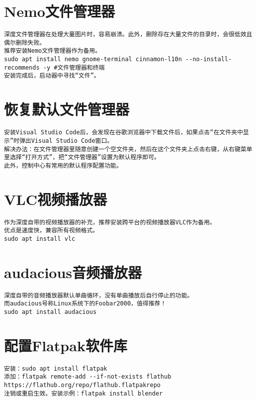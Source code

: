 \documentclass[a4paper,fontset=fandol,zihao=-4,linespread=1.2]{ctexbook}
\begin{document}
\section{Nemo文件管理器}
\begin{lstlisting}
深度文件管理器在处理大量图片时，容易崩溃。此外，删除存在大量文件的目录时，会很低效且偶尔删除失败。
推荐安装Nemo文件管理器作为备用。
sudo apt install nemo gnome-terminal cinnamon-l10n --no-install-recommends -y #文件管理器和终端
安装完成后，启动器中寻找“文件”。
\end{lstlisting}

\section{恢复默认文件管理器}
\begin{lstlisting}
安装Visual Studio Code后，会发现在谷歌浏览器中下载文件后，如果点击“在文件夹中显示”时弹出Visual Studio Code窗口。
解决办法：在文件管理器里随意创建一个空文件夹，然后在这个文件夹上点击右键，从右键菜单里选择“打开方式”，把“文件管理器”设置为默认程序即可。
此外，控制中心有常用的默认程序配置功能。
\end{lstlisting}

\section{VLC视频播放器}
\begin{lstlisting}
作为深度自带的视频播放器的补充，推荐安装跨平台的视频播放器VLC作为备用。
优点是速度快，兼容所有视频格式。
sudo apt install vlc
\end{lstlisting}

\section{audacious音频播放器}
\begin{lstlisting}
深度自带的音频播放器默认单曲循环，没有单曲播放后自行停止的功能。
而audacious号称Linux系统下的Foobar2000，值得推荐！
sudo apt install audacious
\end{lstlisting}

\section{配置Flatpak软件库}
\begin{lstlisting}
安装：sudo apt install flatpak
添加：flatpak remote-add --if-not-exists flathub https://flathub.org/repo/flathub.flatpakrepo
注销或重启生效。安装示例：flatpak install blender
\end{lstlisting}
\end{document}

